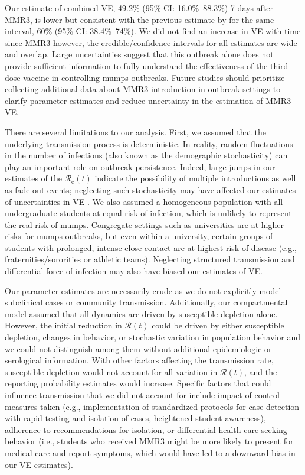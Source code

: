 \documentclass[12pt]{article}
\begin{document}
Our estimate of combined VE, 49.2\% (95\% CI: 16.0\%--88.3\%) 7 days after MMR3, is lower but consistent with the previous estimate by \cite{cardemil2017effectiveness} for the same interval, 60\% (95\% CI: 38.4\%--74\%).
We did not find an increase in VE with time since MMR3 however, the credible/confidence intervals for all estimates are wide and overlap.
Large uncertainties suggest that this outbreak alone does not provide sufficient information to fully understand the effectiveness of the third dose vaccine in controlling mumps outbreaks.
Future studies should prioritize collecting additional data about MMR3 introduction in outbreak settings to clarify parameter estimates and reduce uncertainty in the estimation of MMR3 VE.

There are several limitations to our analysis. 
First, we assumed that the underlying transmission process is deterministic. 
In reality, random fluctuations in the number of infections (also known as the demographic stochasticity) can play an important role on outbreak persistence.
Indeed, large jumps in our estimates of the $\mathcal{R}_{\mathrm c}(t)$ indicate the possibility of multiple introductions as well as fade out events;
neglecting such stochasticity may have affected our estimates of uncertainties in VE \citep{king2015avoidable}.
We also assumed a homogeneous population with all undergraduate students at equal risk of infection, which is unlikely to represent the real risk of mumps. 
Congregate settings such as universities are at higher risks for mumps outbreaks, but even within a university, certain groups of students with prolonged, intense close contact are at highest risk of disease (e.g., fraternities/sororities or athletic teams). 
Neglecting structured transmission and differential force of infection may also have biased our estimates of VE.

Our parameter estimates are necessarily crude as we do not explicitly model subclinical cases or community transmission.
Additionally, our compartmental model assumed that all dynamics are driven by susceptible depletion alone.
However, the initial reduction in $\mathcal R(t)$ could be driven by either susceptible depletion, changes in behavior, or stochastic variation in population behavior and we could not distinguish among them without additional epidemiologic or serological information.
With other factors affecting the transmission rate, susceptible depletion would not account for all variation in $\mathcal R(t)$, and the reporting probability estimates would increase.
Specific factors that could influence transmission that we did not account for include impact of control measures taken (e.g., implementation of standardized protocols for case detection with rapid testing and isolation of cases, heightened student awareness), adherence to recommendations for isolation, or differential health-care seeking behavior (i.e., students who received MMR3 might be more likely to present for medical care and report symptoms, which would have led to a downward bias in our VE estimates).
\end{document}
